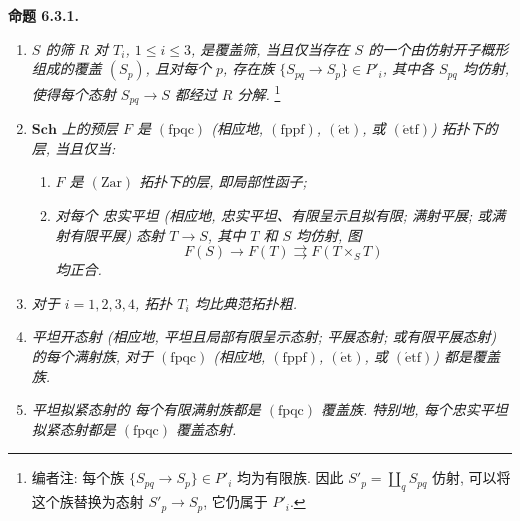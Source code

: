 \medskip
\noindent{}\textbf{命题 6.3.1.}
\begin{enumerate}
  \item[(i)] \textit{\(S\) 的筛 \(R\)
    对 \(T_i\), \(1\leq i\leq3\), 是覆盖筛, 当且仅当存在 \(S\)
    的一个由仿射开子概形组成的覆盖 \((S_p)\), 且对每个 \(p\),
    存在族 \(\{S_{pq}\to S_p\}\in P'_i\), 其中各 \(S_{pq}\) 均仿射,
    使得每个态射 \(S_{pq}\to S\) 都经过 \(R\) 分解.}
    \footnote{编者注: 每个族 \(\{S_{pq}\to S_p\}\in P'_i\) 均为有限族.
    因此 \(S'_p=\coprod_qS_{pq}\) 仿射,
    可以将这个族替换为态射 \(S'_p\to S_p\), 它仍属于 \(P'_i\).}

  \item[(ii)] \textit{\(\mathbf{Sch}\)
    上的预层 \(F\) 是 \((\mathrm{fpqc})\)
    (相应地, \((\mathrm{fppf})\), \((\mathrm{\acute et})\),
    或 \((\mathrm{\acute etf})\)) 拓扑下的层, 当且仅当:}
    \begin{enumerate}
      \item[(a)] \textit{\(F\)
        是 \((\mathrm{Zar})\) 拓扑下的层, 即局部性函子;}
      \item[(b)] \textit{对每个
        忠实平坦 (相应地, 忠实平坦、有限呈示且拟有限; 满射平展; 或满射有限平展)
        态射 \(T\to S\), 其中 \(T\) 和 \(S\) 均仿射, 图}
        \[
          F(S)\longrightarrow F(T)\rightrightarrows F(T\times_ST)
        \]
        \textit{均正合.}
    \end{enumerate}

  \item[(iii)] \textit{对于 \(i=1,2,3,4\),
    拓扑 \(T_i\) 均比典范拓扑粗.}

  \item[(iv)] \textit{平坦开态射
    (相应地, 平坦且局部有限呈示态射; 平展态射; 或有限平展态射) 的每个满射族,
    对于 \((\mathrm{fpqc})\) (相应地, \((\mathrm{fppf})\),
    \((\mathrm{\acute et})\), 或 \((\mathrm{\acute etf})\)) 都是覆盖族.}

  \item[(v)] \textit{平坦拟紧态射的
    每个有限满射族都是 \((\mathrm{fpqc})\) 覆盖族.
    特别地, 每个忠实平坦拟紧态射都是 \((\mathrm{fpqc})\) 覆盖态射.}
\end{enumerate}


